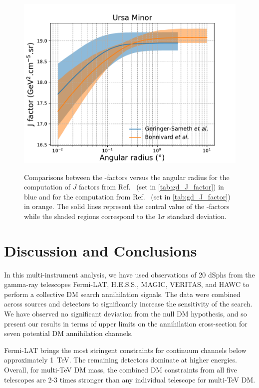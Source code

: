 \begin{figure}[ht]
{    \includegraphics[scale=0.32]{figures/glory_duck/appendix/UrsaMinor.pdf}
}
    \caption{Comparisons between the \J-factors versus the angular radius for the computation of $J$ factors from Ref.~\cite{Geringer-Sameth:2014yza} (\GS set in \cref{tab:gd_J_factor}) in blue and for the computation from Ref.~\cite{Bonnivard:2014kza, Bonnivard:2015xpq} (\B set in \cref{tab:gd_J_factor}) in orange. The solid lines represent the central value of the \J-factors while the shaded regions correspond to the 1$\sigma$ standard deviation.}
\label{fig:comparison_J_2}
\end{figure}

\section{Discussion and Conclusions\label{sec:gd_conclusions}}

In this multi-instrument analysis, we have used observations of 20 dSphs from the gamma-ray telescopes Fermi-LAT, H.E.S.S., MAGIC, VERITAS, and HAWC to perform a collective DM search annihilation signals.
The data were combined across sources and detectors to significantly increase the sensitivity of the search.
We have observed no significant deviation from the null DM hypothesis, and so present our results in terms of upper limits on the annihilation cross-section for seven potential DM annihilation channels.

Fermi-LAT brings the most stringent constraints for continuum channels below approximately 1~TeV.
The remaining detectors dominate at higher energies.
Overall, for multi-TeV DM mass, the combined DM constraints from all five telescopes are 2-3 times stronger than any individual telescope for multi-TeV DM.


